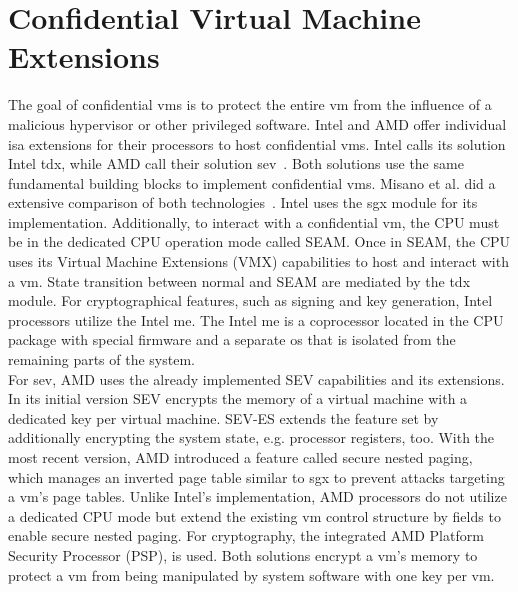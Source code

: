 \section{Confidential Virtual Machine Extensions}
\label{section:20:confidential_vms}
The goal of confidential \glspl{vm} is to protect the entire \gls{vm} from
the influence of a malicious hypervisor or other privileged software. Intel and
AMD offer individual \gls{isa} extensions for their processors to host
confidential \glspl{vm}. Intel calls its solution Intel \gls{tdx}, while AMD
call their solution \gls{sev}~\cite{tdx_whitepaper,kaplan_amd_2020}. Both
solutions use the same fundamental building blocks to implement
confidential \glspl{vm}. Misano et al. did a extensive comparison of both
technologies~\cite{misono2024confidential}. Intel uses the \gls{sgx} module for
its implementation. Additionally, to interact with a confidential \gls{vm}, the
CPU must be in the dedicated CPU operation mode called SEAM. Once in SEAM, the
CPU uses its Virtual Machine Extensions (VMX) capabilities to host and interact
with a \gls{vm}. State transition between normal and SEAM are mediated by the
\gls{tdx} module. For cryptographical features, such as signing and key
generation, Intel processors utilize the Intel \gls{me}. The Intel
\gls{me} is a coprocessor located in the CPU package with special
firmware and a separate \gls{os} that is isolated from the remaining parts of
the system.\\

For \gls{sev}, AMD uses the already implemented SEV capabilities and its
extensions. In its initial version SEV encrypts the memory of a virtual machine
with a dedicated key per virtual machine. SEV-ES extends the feature set by
additionally encrypting the system state, e.g. processor registers, too. With
the most recent version, AMD introduced a feature called secure nested paging,
which manages an inverted page table similar to \gls{sgx} to prevent attacks
targeting a \gls{vm}'s page tables. Unlike Intel's implementation, AMD
processors do not utilize a dedicated CPU mode but extend the existing \gls{vm}
control structure by fields to enable secure nested paging. For cryptography,
the integrated AMD Platform Security Processor (PSP), is used. Both solutions
encrypt a \gls{vm}'s memory to protect a \gls{vm} from being manipulated by
system software with one key per \gls{vm}.\\


